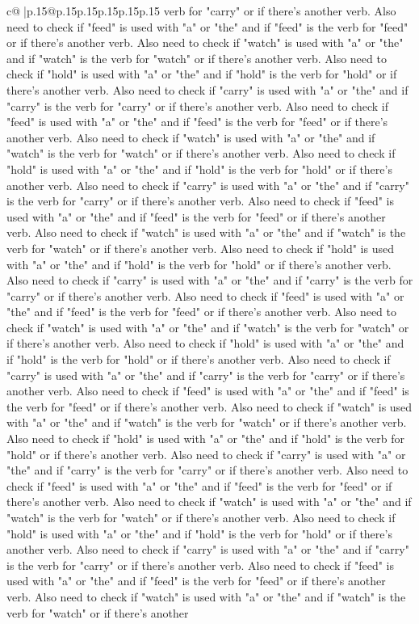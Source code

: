 \documentclass{article}
\begin{document}
{\begin{supertabular}{c@{$\;$}|p{.15\linewidth}@{}p{.15\linewidth}p{.15\linewidth}p{.15\linewidth}p{.15\linewidth}p{.15\linewidth}}
{{{verb for "carry" or if there's another verb. Also need to check if "feed" is used with "a" or "the" and if "feed" is the verb for "feed" or if there's another verb. Also need to check if "watch" is used with "a" or "the" and if "watch" is the verb for "watch" or if there's another verb. Also need to check if "hold" is used with "a" or "the" and if "hold" is the verb for "hold" or if there's another verb. Also need to check if "carry" is used with "a" or "the" and if "carry" is the verb for "carry" or if there's another verb. Also need to check if "feed" is used with "a" or "the" and if "feed" is the verb for "feed" or if there's another verb. Also need to check if "watch" is used with "a" or "the" and if "watch" is the verb for "watch" or if there's another verb. Also need to check if "hold" is used with "a" or "the" and if "hold" is the verb for "hold" or if there's another verb. Also need to check if "carry" is used with "a" or "the" and if "carry" is the verb for "carry" or if there's another verb. Also need to check if "feed" is used with "a" or "the" and if "feed" is the verb for "feed" or if there's another verb. Also need to check if "watch" is used with "a" or "the" and if "watch" is the verb for "watch" or if there's another verb. Also need to check if "hold" is used with "a" or "the" and if "hold" is the verb for "hold" or if there's another verb. Also need to check if "carry" is used with "a" or "the" and if "carry" is the verb for "carry" or if there's another verb. Also need to check if "feed" is used with "a" or "the" and if "feed" is the verb for "feed" or if there's another verb. Also need to check if "watch" is used with "a" or "the" and if "watch" is the verb for "watch" or if there's another verb. Also need to check if "hold" is used with "a" or "the" and if "hold" is the verb for "hold" or if there's another verb. Also need to check if "carry" is used with "a" or "the" and if "carry" is the verb for "carry" or if there's another verb. Also need to check if "feed" is used with "a" or "the" and if "feed" is the verb for "feed" or if there's another verb. Also need to check if "watch" is used with "a" or "the" and if "watch" is the verb for "watch" or if there's another verb. Also need to check if "hold" is used with "a" or "the" and if "hold" is the verb for "hold" or if there's another verb. Also need to check if "carry" is used with "a" or "the" and if "carry" is the verb for "carry" or if there's another verb. Also need to check if "feed" is used with "a" or "the" and if "feed" is the verb for "feed" or if there's another verb. Also need to check if "watch" is used with "a" or "the" and if "watch" is the verb for "watch" or if there's another verb. Also need to check if "hold" is used with "a" or "the" and if "hold" is the verb for "hold" or if there's another verb. Also need to check if "carry" is used with "a" or "the" and if "carry" is the verb for "carry" or if there's another verb. Also need to check if "feed" is used with "a" or "the" and if "feed" is the verb for "feed" or if there's another verb. Also need to check if "watch" is used with "a" or "the" and if "watch" is the verb for "watch" or if there's another }}}
\end{supertabular}}
\end{document}
